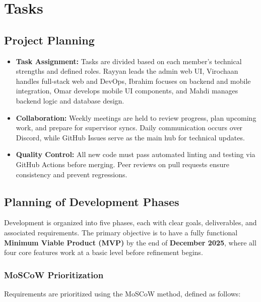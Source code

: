 \documentclass[12pt]{article}
\begin{document}
\section{Tasks}
\subsection{Project Planning }

\begin{itemize}
    \item \textbf{Task Assignment:} Tasks are divided based on each member’s technical strengths and defined roles.
    Rayyan leads the admin web UI, Virochaan handles full-stack web and DevOps, Ibrahim focuses on backend and mobile integration, Omar develops mobile UI components, and Mahdi manages backend logic and database design.
    \item \textbf{Collaboration:} Weekly meetings are held to review progress, plan upcoming work, and prepare for supervisor syncs.
    Daily communication occurs over Discord, while GitHub Issues serve as the main hub for technical updates.
    \item \textbf{Quality Control:} All new code must pass automated linting and testing via GitHub Actions before merging.
    Peer reviews on pull requests ensure consistency and prevent regressions.
\end{itemize}

\subsection{Planning of Development Phases}

Development is organized into five phases, each with clear goals, deliverables, and associated
requirements. The primary objective is to have a fully functional \textbf{Minimum Viable Product
(MVP)} by the end of \textbf{December 2025}, where all four core features work at a basic level
before refinement begins.

\subsubsection*{MoSCoW Prioritization}

Requirements are prioritized using the MoSCoW method, defined as follows:
\end{document}
